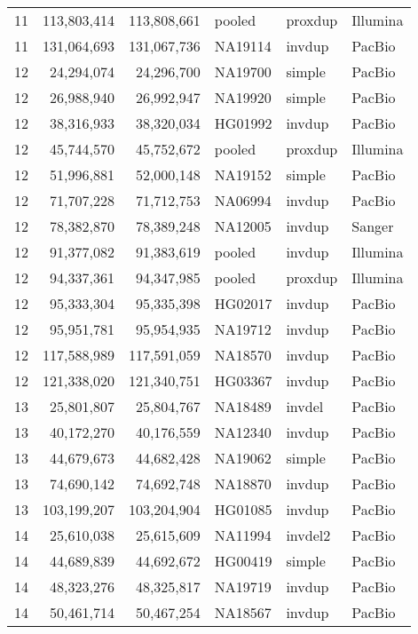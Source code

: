 {\begin{longtable}{rrrlll}
    11  & 113,803,414 & 113,808,661 & pooled  & proxdup & Illumina  \\
    11  & 131,064,693 & 131,067,736 & NA19114 & invdup  & PacBio  \\
    12  & 24,294,074  & 24,296,700  & NA19700 & simple  & PacBio  \\
    12  & 26,988,940  & 26,992,947  & NA19920 & simple  & PacBio  \\
    12  & 38,316,933  & 38,320,034  & HG01992 & invdup  & PacBio  \\
    12  & 45,744,570  & 45,752,672  & pooled  & proxdup & Illumina  \\
    12  & 51,996,881  & 52,000,148  & NA19152 & simple  & PacBio  \\
    12  & 71,707,228  & 71,712,753  & NA06994 & invdup  & PacBio  \\
    12  & 78,382,870  & 78,389,248  & NA12005 & invdup  & Sanger  \\
    12  & 91,377,082  & 91,383,619  & pooled  & invdup  & Illumina  \\
    12  & 94,337,361  & 94,347,985  & pooled  & proxdup & Illumina  \\
    12  & 95,333,304  & 95,335,398  & HG02017 & invdup  & PacBio  \\
    12  & 95,951,781  & 95,954,935  & NA19712 & invdup  & PacBio  \\
    12  & 117,588,989 & 117,591,059 & NA18570 & invdup  & PacBio  \\
    12  & 121,338,020 & 121,340,751 & HG03367 & invdup  & PacBio  \\
    13  & 25,801,807  & 25,804,767  & NA18489 & invdel  & PacBio  \\
    13  & 40,172,270  & 40,176,559  & NA12340 & invdup  & PacBio  \\
    13  & 44,679,673  & 44,682,428  & NA19062 & simple  & PacBio  \\
    13  & 74,690,142  & 74,692,748  & NA18870 & invdup  & PacBio  \\
    13  & 103,199,207 & 103,204,904 & HG01085 & invdup  & PacBio  \\
    14  & 25,610,038  & 25,615,609  & NA11994 & invdel2 & PacBio  \\
    14  & 44,689,839  & 44,692,672  & HG00419 & simple  & PacBio  \\
    14  & 48,323,276  & 48,325,817  & NA19719 & invdup  & PacBio  \\
    14  & 50,461,714  & 50,467,254  & NA18567 & invdup  & PacBio  \\

\end{longtable}}
